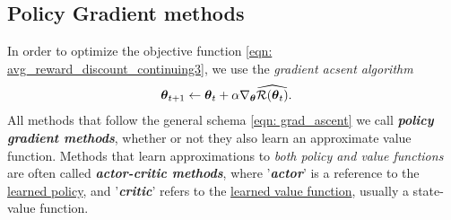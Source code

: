 \documentclass[11pt]{article}
\begin{document}
\subsection{Policy Gradient methods}
In order to optimize the objective function \eqref{eqn: avg_reward_discount_continuing3}, we use the \emph{gradient acsent algorithm}
\begin{align}
\boldsymbol{\theta}_{t+1} &\leftarrow \boldsymbol{\theta}_t + \alpha \nabla_{\boldsymbol{\theta}}{\widehat{{\mathcal R}(\boldsymbol{\theta}_t)}}. \label{eqn: grad_ascent}
\end{align} All methods that follow the general schema \eqref{eqn: grad_ascent} we call \textbf{\emph{policy gradient methods}}, whether or not they also learn an approximate value function. Methods that learn approximations to \emph{both policy and value functions} are often called \textbf{\emph{actor-critic methods}}, where '\emph{\textbf{actor}}' is a reference to the \underline{learned policy}, and '\textbf{\emph{critic}}' refers to the \underline{learned value function}, usually a state-value function.
\end{document}
